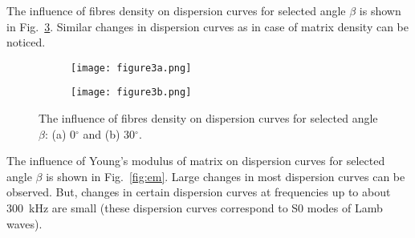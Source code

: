 \documentclass[preprint,12pt]{elsarticle}
\begin{document}
The influence of fibres density on dispersion curves for selected angle \(\beta\) is 
shown 
in Fig.~\ref{fig:rhof}. Similar changes in dispersion curves as in case of matrix density 
can be noticed.

\begin{figure} [h!]
	\centering
	\begin{subfigure}[b]{0.49\textwidth}
		\centering
		\texttt{[image: figure3a.png]}
		\caption{}
		\label{fig:rhof0}
	\end{subfigure}
	\hfill
	\begin{subfigure}[b]{0.49\textwidth}
		\centering
		\texttt{[image: figure3b.png]}
		\caption{}
		\label{fig:rhof30}
	\end{subfigure}
	\caption{The influence of fibres density on dispersion curves for selected angle 
	\(\beta\): (a) 0\(^{\circ}\) and (b) 30\(^{\circ}\).} 
	\label{fig:rhof}
\end{figure}

The influence of Young's modulus of matrix on dispersion curves for selected angle 
\(\beta\) is shown in Fig.~\ref{fig:em}. Large changes in most dispersion curves can be 
observed. But, changes in certain dispersion curves at frequencies up to about 
300~kHz are small (these dispersion curves correspond to S0 modes of Lamb waves).
\end{document}
